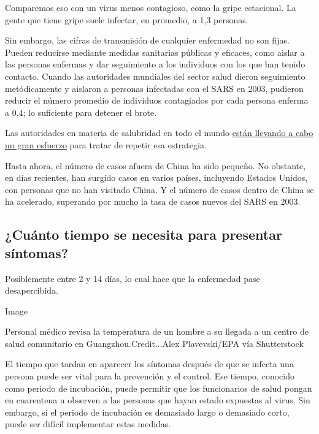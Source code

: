 Comparemos eso con un virus menos contagioso, como la gripe estacional.
La gente que tiene gripe suele infectar, en promedio, a 1,3 personas.

Sin embargo, las cifras de transmisión de cualquier enfermedad no son
fijas. Pueden reducirse mediante medidas sanitarias públicas y eficaces,
como aislar a las personas enfermas y dar seguimiento a los individuos
con los que han tenido contacto. Cuando las autoridades mundiales del
sector salud dieron seguimiento metódicamente y aislaron a personas
infectadas con el SARS en 2003, pudieron reducir el número promedio de
individuos contagiados por cada persona enferma a 0,4; lo suficiente
para detener el brote.

Las autoridades en materia de salubridad en todo el mundo
\href{https://www.nytimes.com/2020/01/29/health/china-coronavirus-outbreak.html}{están
llevando a cabo un gran esfuerzo} para tratar de repetir esa estrategia.

Hasta ahora, el número de casos afuera de China ha sido pequeño. No
obstante, en días recientes, han surgido casos en varios países,
incluyendo Estados Unidos, con personas que no han visitado China. Y el
número de casos dentro de China se ha acelerado, superando por mucho la
tasa de casos nuevos del SARS en 2003.

\hypertarget{cuuxe1nto-tiempo-se-necesita-para-presentar-suxedntomas}{%
\subsection{¿Cuánto tiempo se necesita para presentar
síntomas?}\label{cuuxe1nto-tiempo-se-necesita-para-presentar-suxedntomas}}

Posiblemente entre 2 y 14 días, lo cual hace que la enfermedad pase
desapercibida.

Image

Personal médico revisa la temperatura de un hombre a su llegada a un
centro de salud comunitario en Guangzhou.Credit...Alex Plavevski/EPA vía
Shutterstock

El tiempo que tardan en aparecer los síntomas después de que se infecta
una persona puede ser vital para la prevención y el control. Ese tiempo,
conocido como periodo de incubación, puede permitir que los funcionarios
de salud pongan en cuarentena u observen a las personas que hayan estado
expuestas al virus. Sin embargo, si el periodo de incubación es
demasiado largo o demasiado corto, puede ser difícil implementar estas
medidas.

